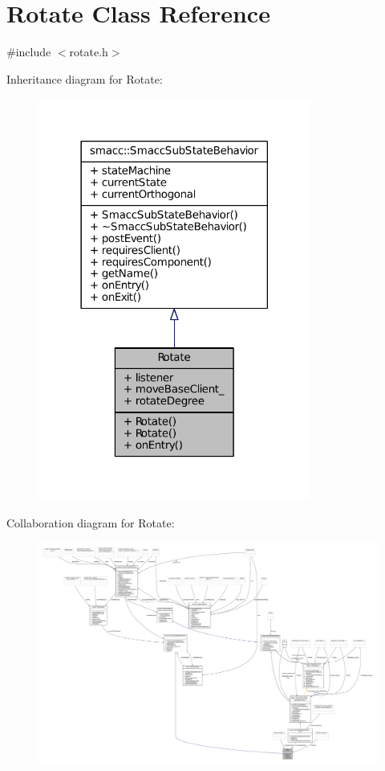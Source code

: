 \hypertarget{classRotate}{}\section{Rotate Class Reference}
\label{classRotate}


{\ttfamily \#include $<$rotate.\+h$>$}



Inheritance diagram for Rotate\+:
\nopagebreak
\begin{figure}[H]
\begin{center}
\leavevmode
\includegraphics[width=254pt]{classRotate__inherit__graph}
\end{center}
\end{figure}


Collaboration diagram for Rotate\+:
\nopagebreak
\begin{figure}[H]
\begin{center}
\leavevmode
\includegraphics[width=350pt]{classRotate__coll__graph}
\end{center}
\end{figure}
